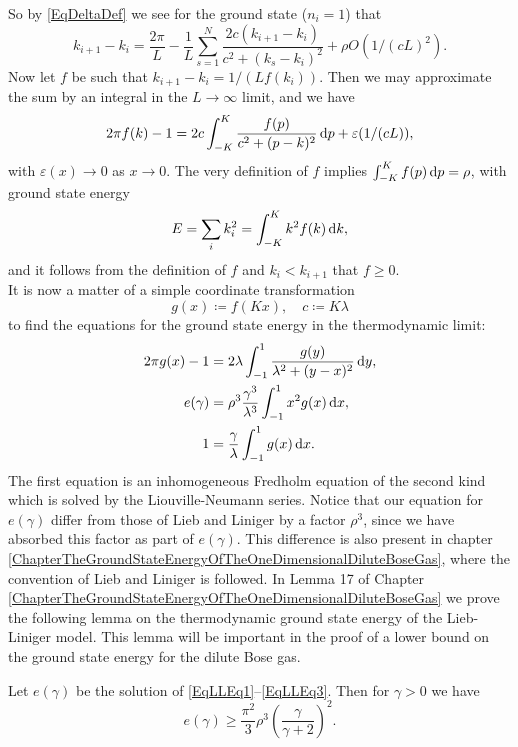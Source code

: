 So by \eqref{EqDeltaDef} we see for the ground state ($ n_i=1 $) that \begin{equation}
k_{i+1}-k_i=\frac{2\pi}{L}-\frac{1}{L}\sum_{s=1}^{N}\frac{2c(k_{i+1}-k_i)}{c^2+(k_s-k_i)^2}+\rho O(1/(cL)^2).
\end{equation}
Now let $ f $ be such that $ k_{i+1}-k_i=1/(Lf(k_i)) $. Then we may approximate the sum by an integral in the $L\to\infty$ limit, and we have \begin{equation}
2\pi f(k)-1=2c\int_{-K}^{K}\frac{f(p)}{c^2+(p-k)^2}\mathop{}\!\mathrm{d} p+\varepsilon(1/(cL)),
\end{equation}
with $\varepsilon(x)\to 0$ as $ x\to 0 $.
The very definition of $ f $ implies $ \int_{-K}^{K}f(p)\mathop{}\!\mathrm{d} p=\rho $, with ground state energy\begin{equation}
E=\sum_{i}k_i^2=\int_{-K}^{K}k^2f(k)\mathop{}\!\mathrm{d} k,
\end{equation} 
and it follows from the definition of $ f $ and $ k_i<k_{i+1} $ that $ f\geq 0 $.\\
It is now a matter of a simple coordinate transformation\begin{equation}
g(x)\coloneqq f(Kx),\quad  c\coloneqq K\lambda
\end{equation}
to find the equations for the ground state energy in the thermodynamic limit:
\begin{align}
2\pi g(x)-1&=2\lambda\int_{-1}^{1}\frac{g(y)}{\lambda^2+(y-x)^2}\mathop{}\!\mathrm{d} y\label{EqLLEq1},\\
e(\gamma)&=\rho^3\frac{\gamma^3}{\lambda^3}\int_{-1}^{1}x^2 g(x)\mathop{}\!\mathrm{d} x\label{EqLLEq2},\\
1&=\frac{\gamma}{\lambda}\int_{-1}^{1}g(x)\mathop{}\!\mathrm{d} x.\label{EqLLEq3}
\end{align}
The first equation is an inhomogeneous Fredholm equation of the second kind which is solved by the Liouville-Neumann series. Notice that our equation for  $ e(\gamma) $ differ from those of Lieb and Liniger by a factor $ \rho^3 $, since we have absorbed this factor as part of $ e(\gamma) $. This difference is also present in chapter \ref{ChapterTheGroundStateEnergyOfTheOneDimensionalDiluteBoseGas}, where the convention of Lieb and Liniger is followed. In Lemma 17 of Chapter \ref{ChapterTheGroundStateEnergyOfTheOneDimensionalDiluteBoseGas} we prove the following lemma on the thermodynamic ground state energy of the Lieb-Liniger model. This lemma will be important in the proof of a lower bound on the ground state energy for the dilute Bose gas.
\begin{lemma}
	Let $ e(\gamma) $ be the solution of \eqref{EqLLEq1}--\eqref{EqLLEq3}. Then for $ \gamma>0 $ we have \begin{equation}
	e(\gamma)\geq \frac{\pi^2}{3}\rho^3\left(\frac{\gamma}{\gamma+2}\right)^2.
	\end{equation}
\end{lemma}

